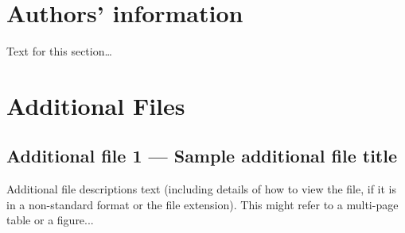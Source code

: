 \documentclass{bmcart}
\begin{document}
\begin{backmatter}
\section*{Authors' information}%
Text for this section\ldots


 
 


 

 
 

\section*{Additional Files}
  \subsection*{Additional file 1 --- Sample additional file title}
    Additional file descriptions text (including details of how to
    view the file, if it is in a non-standard format or the file extension).  This might
    refer to a multi-page table or a figure...
 

\end{backmatter}
\end{document}
